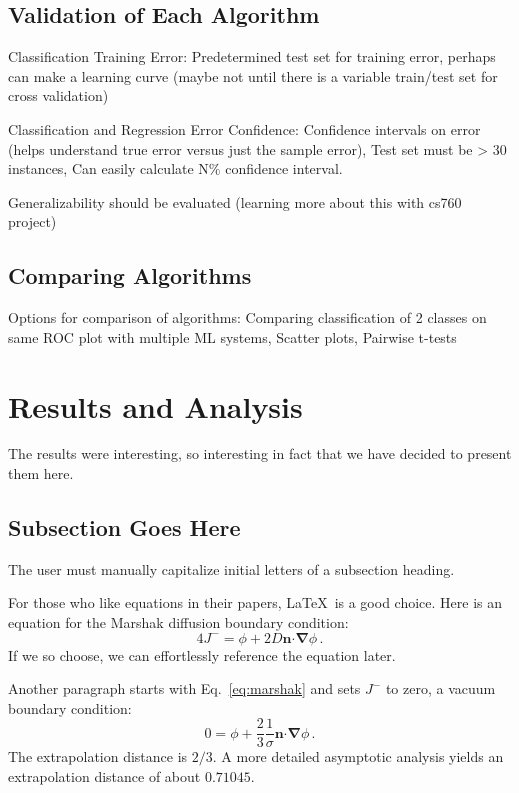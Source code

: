 \documentclass{anstrans}
\renewcommand{\vec}[1]{\bm{#1}} %
\newcommand{\vd}{\bm{\cdot}} %
\newcommand{\grad}{\vec{\nabla}} %
\begin{document}
\subsection{Validation of Each Algorithm}

Classification Training Error: Predetermined test set for training error,
perhaps can make a learning curve (maybe not until there is a variable
train/test set for cross validation)

Classification and Regression Error Confidence: Confidence intervals on error
(helps understand true error versus just the sample error), Test set must be >
30 instances, Can easily calculate N\% confidence interval.

Generalizability should be evaluated (learning more about this with cs760
project)

\subsection{Comparing Algorithms}

Options for comparison of algorithms: Comparing classification of 2 classes on
same ROC plot with multiple ML systems, Scatter plots, Pairwise t-tests

\section{Results and Analysis}
The results were interesting, so interesting in fact that we have decided to
present them here.

\subsection{Subsection Goes Here}
The user must manually capitalize initial letters of a subsection heading.

For those who like equations in their papers, \LaTeX\ is a good choice. Here is
an equation for the Marshak diffusion boundary condition:
\begin{equation} \label{eq:marshak}
  4 J^- = \phi + 2 D \vec{n} \vd \grad \phi \,.
\end{equation}
If we so choose, we can effortlessly reference the equation later.

Another paragraph starts with Eq.~\eqref{eq:marshak} and sets $J^-$ to zero, a
vacuum boundary condition:
\begin{equation*}
  0 = \phi + \frac{2}{3} \frac{1}{\sigma} \vec{n} \vd \grad \phi \,.
\end{equation*}
The extrapolation distance is $2/3$. A more detailed asymptotic analysis yields
an extrapolation distance of about $0.71045$.
\end{document}
